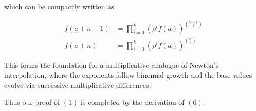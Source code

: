 which can be compactly written as:

\begin{align}
f(a + n - 1) &= \prod_{i=0}^{k} \left( \rho^i f(a) \right)^{\binom{n-1}{i}} \\
f(a + n)     &= \prod_{i=0}^{k} \left( \rho^i f(a) \right)^{\binom{n}{i}}
\end{align}

This forms the foundation for a multiplicative analogue of Newton’s interpolation, where the exponents follow binomial growth and the base values evolve via successive multiplicative differences.

Thus our proof of $(1)$ is completed by the derivation of $(6)$.
